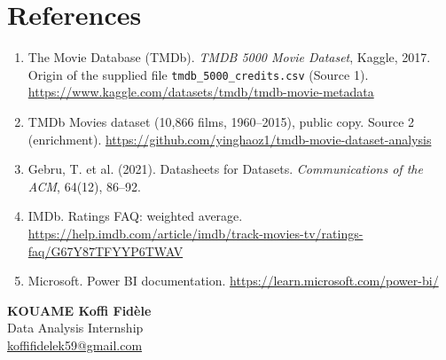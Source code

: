 \documentclass[12pt,a4paper]{article}
\begin{document}
\section*{References}
{\small\begin{enumerate}[itemsep=0pt]
\item The Movie Database (TMDb). \emph{TMDB 5000 Movie Dataset}, Kaggle, 2017. Origin of
the supplied file \texttt{tmdb\_5000\_credits.csv} (Source 1).
\url{https://www.kaggle.com/datasets/tmdb/tmdb-movie-metadata}
\item TMDb Movies dataset (10{,}866 films, 1960--2015), public copy. Source 2 (enrichment).
\url{https://github.com/yinghaoz1/tmdb-movie-dataset-analysis}
\item Gebru, T. et al. (2021). Datasheets for Datasets. \emph{Communications of the ACM}, 64(12), 86--92.
\item IMDb. Ratings FAQ: weighted average. \url{https://help.imdb.com/article/imdb/track-movies-tv/ratings-faq/G67Y87TFYYP6TWAV}
\item Microsoft. Power BI documentation. \url{https://learn.microsoft.com/power-bi/}
\end{enumerate}}

\enlargethispage{4\baselineskip}
\vspace{0.1cm}
\noindent\hfill\begin{minipage}{7cm}\begin{flushright}\singlespacing
\textbf{KOUAME Koffi Fid\`ele}\\
Data Analysis Internship\\
\href{mailto:koffifidelek59@gmail.com}{koffifidelek59@gmail.com}
\end{flushright}\end{minipage}
\end{document}
